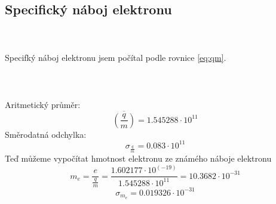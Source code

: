\documentclass{article}
\begin{document}
\subsection{Specifický náboj elektronu}
\\
\vspace{1em}
\\
Specifký náboj elektronu jsem počítal podle rovnice \ref{eq:qm}.
\\
\vspace{1em}
\\
\\
\vspace{1em}
\\
Aritmetický průměr:
$$\overline{ \left( \frac{q}{m} \right)} = 1.545288 \cdot 10^{11}$$
Směrodatná odchylka:
$$\sigma_{\frac{q}{m}} = 0.083 \cdot 10^{11}$$
\vspace{1em}
Teď můžeme vypočítat hmotnost elektronu ze známého náboje elektronu
$$m_{e} = \frac{e}{\frac{q}{m}} = \frac{1.602177 \cdot 10^{(-19)}}{1.545288 \cdot 10^{11}} = 10.3682 \cdot 10^{-31}$$
$$\sigma_{m_{e}} = 0.019326 \cdot 10^{-31}$$
\end{document}
